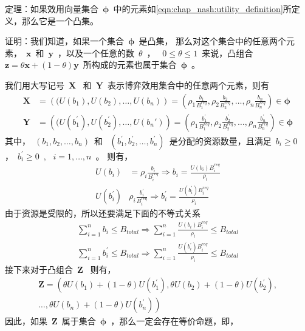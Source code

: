 定理：如果效用向量集合~$\mathbf{\phi}$~中的元素如\eqref{eqn:chap_nash:utility_definition}所定义，那么它是一个凸集。

证明：我们知道，如果一个集合~$\mathbf{\phi}$~是凸集，
那么对这个集合中的任意两个元素，~$\mathbf{x}$~和~$\mathbf{y}$~，以及一个任意的数~$\theta$~， ~$0\le \theta\le 1$~来说，凸组合~$\mathbf{z}=\theta \mathbf{x} + (1-\theta) \mathbf{y}$~所构成的元素也属于集合~$\mathbf{\phi}$~。

我们用大写记号~$\mathbf{X}$~ 和~$\mathbf{Y}$~表示博弈效用集合中的任意两个元素，则有
\begin{align*}
    \mathbf{X} &=\left( (U(b_1), U(b_2), \ldots, U(b_n) \right)
    = \left( \rho_1 \frac{b_1}{B_1^{req}},\rho_2 \frac{b_2}{B_2^{req}},\ldots, \rho_n \frac{b_n}{B_n^{req}} \right) \in \mathbf{\phi} \\
    \mathbf{Y} &=\left( (U(b_1^\prime), U(b_2^\prime), \ldots, U(b_n\prime) \right)
    = \left( \rho_1 \frac{b_1^\prime}{B_1^{req}},\rho_2 \frac{b_2^\prime}{B_2^{req}},\ldots, \rho_n \frac{b_n^\prime}{B_n^{req}} \right) \in \mathbf{\phi} 
\end{align*}
其中，~$(b_1, b_2, \ldots, b_n)$~和 ~$(b_1^\prime, b_2^\prime, \ldots, b_n^\prime)$~是分配的资源数量，且满足~$b_i \ge 0$~ ，~$b_i^\prime \ge 0$~, ~$i = 1, \ldots, n$~。
则有，
\begin{align*}
    U(b_i) &= \rho_i \frac{b_i}{B_i^{req}} \Rightarrow b_i = \frac{U(b_i)B_i^{req}}{\rho_i} \\
    U(b_i^\prime) & \rho_i \frac{b_i^\prime} {B_i^{req}} \Rightarrow b_i^\prime = \frac{U(b_i^\prime) B_i^{req}}{\rho_i}
\end{align*}
由于资源是受限的，所以还要满足下面的不等式关系
\begin{align*}
    \sum_{i=1}^n b_i \le B_{total} \Rightarrow \sum_{i=1}^n \frac{U(b_i)B_i^{req}}{\rho_i} \le B_{total}\\
    \sum_{i=1}^n b_i^\prime \le B_{total}\Rightarrow \sum_{i=1}^n \frac{U(b_i^\prime)B_i^{req}}{\rho_i} \le B_{total}
\end{align*}
接下来对于凸组合~$\mathbf{Z}$~ 则有，
\begin{align*}
    \mathbf{Z} = \left( \theta U(b_1) + (1-\theta) U(b_1^\prime),    \theta U(b_2) + (1-\theta) U(b_2^\prime), \right. \\
    \ldots,  \left. \theta U(b_n) + (1-\theta) U(b_n^\prime) \right)
\end{align*}
因此，如果~$\mathbf{Z}$~属于集合~$\mathbf{\phi}$~，那么一定会存在等价命题，即，
